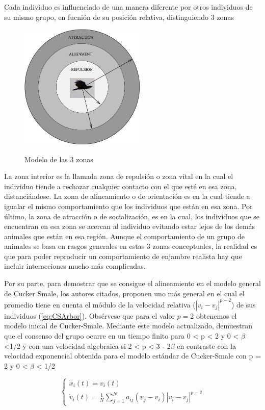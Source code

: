 Cada individuo es influenciado de una manera diferente por otros individuos de su mismo grupo, en fucnión de su posición relativa, distinguiendo 3 zonas
\begin{figure}[h!]
    \centering
    {\includegraphics[height=6cm]{fig/cap03/3zones.png}}
    \caption{Modelo de las 3 zonas}
    \label{fig:3zonesModel}
\end{figure}

La zona interior es la llamada zona de repulsión o zona vital en la cual el individuo tiende a rechazar cualquier contacto con el que esté en esa zona, distanciándose. La zona de alineamiento o de orientación es en la cual tiende a igualar el mismo comportamiento que los individuos que están en esa zona. Por último, la zona de atracción o de socialización, es en la cual, los individuos que se encuentran en esa zona se acercan al individuo evitando estar lejos de los demás animales que están en esa región. Aunque el comportamiento de un grupo de animales se basa en rasgos generales en estas 3 zonas conceptuales, la realidad es que para poder reproducir un comportamiento de enjambre realista hay que incluir interacciones mucho más complicadas.

Por su parte, para demostrar que se consigue el alineamiento en el modelo general de Cucker Smale, los autores citados, proponen uno más general en el cual el promedio tiene en cuenta el módulo de la velocidad relativa ($ |v_{i}-v_{j}|^{p-2} $) de sus individuos (\ref{eq:CSArbor}). Obsérvese que para el valor $p = 2$ obtenemos el modelo inicial de Cucker-Smale. Mediante este modelo actualizado, demuestran que el consenso del grupo ocurre en un tiempo finito para 0 < p < 2 y 0 < $\beta$ <1/2 y con una velocidad algebraica si 2 < p < 3 - 2$\beta$ en contraste con la velocidad exponencial obtenida para el modelo estándar de Cucker-Smale con p = 2 y 0 < $\beta$ < 1/2


\begin{equation}\label{eq:CSArbor} 
    \left\lbrace
    \begin{array}{l}
        \dot{x}_{i}(t)=v_{i}(t) \\
        \dot{v}_{i}(t)= \displaystyle{\frac{1}{N}\sum_{j=1}^{N}a_{ij}(v_{j}-v_{i})|v_{i}-v_{j}|^{p-2}}
    \end{array}
    \right.
\end{equation}

